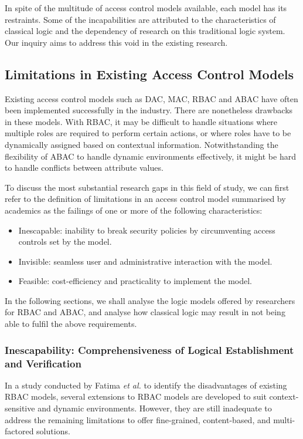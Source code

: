 \documentclass{article}
\begin{document}
In spite of the multitude of access control models available, each model has its restraints. Some of the incapabilities are attributed to the characteristics of classical logic and the dependency of research on this traditional logic system. Our inquiry aims to address this void in the existing research.

\subsection{Limitations in Existing Access Control Models}

Existing access control models such as DAC, MAC, RBAC and ABAC have often been implemented successfully in the industry. There are nonetheless drawbacks in these models. With RBAC, it may be difficult to handle situations where multiple roles are required to perform certain actions, or where roles have to be dynamically assigned based on contextual information. Notwithstanding the flexibility of ABAC to handle dynamic environments effectively, it might be hard to handle conflicts between attribute values.

To discuss the most substantial research gaps in this field of study, we can first refer to the definition of limitations in an access control model summarised by academics as the failings of one or more of the following characteristics: \cite{limitations}
\begin{itemize}
    \item Inescapable: inability to break security policies by circumventing access controls set by the model.
    \item Invisible: seamless user and administrative interaction with the model.
    \item Feasible: cost-efficiency and practicality to implement the model.
\end{itemize}

In the following sections, we shall analyse the logic models offered by researchers for RBAC and ABAC, and analyse how classical logic may result in not being able to fulfil the above requirements.

\subsubsection{Inescapability: Comprehensiveness of Logical Establishment and Verification}

In a study conducted by Fatima \textit{et al.} to identify the disadvantages of existing RBAC models, several extensions to RBAC models are developed to suit context-sensitive and dynamic environments.\cite{rbac-vs-abac} However, they are still inadequate to address the remaining limitations to offer fine-grained, content-based, and multi-factored solutions.
\end{document}
